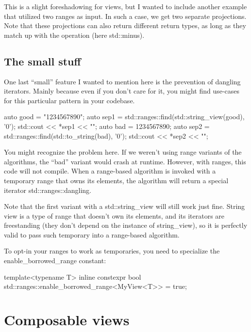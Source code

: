 This is a slight foreshadowing for views, but I wanted to include another example that utilized two ranges as input. In such a case, we get two separate projections. Note that these projections can also return different return types, as long as they match up with the operation (here std::minus).

\subsection{The small stuff}

One last “small” feature I wanted to mention here is the prevention of dangling iterators. Mainly because even if you don’t care for it, you might find use-cases for this particular pattern in your codebase.

\begin{box-note}
\begin{cppcode}
auto good = "1234567890";
auto sep1 = std::ranges::find(std::string_view(good), '0');
std::cout << *sep1 << "\n";
auto bad = 1234567890;
auto sep2 = std::ranges::find(std::to_string(bad), '0');
std::cout << *sep2 << "\n";
\end{cppcode}
\end{box-note}

You might recognize the problem here. If we weren’t using range variants of the algorithms, the “bad” variant would crash at runtime. However, with ranges, this code will not compile. When a range-based algorithm is invoked with a temporary range that owns its elements, the algorithm will return a special iterator std::ranges::dangling.

Note that the first variant with a std::string\_view will still work just fine. String view is a type of range that doesn’t own its elements, and its iterators are freestanding (they don’t depend on the instance of string\_view), so it is perfectly valid to pass such temporary into a range-based algorithm.

To opt-in your ranges to work as temporaries, you need to specialize the enable\_borrowed\_range constant:

\begin{box-note}
\begin{cppcode}
template<typename T>
inline constexpr bool 
    std::ranges::enable_borrowed_range<MyView<T>> = true;
\end{cppcode}
\end{box-note}

\section{Composable views}

